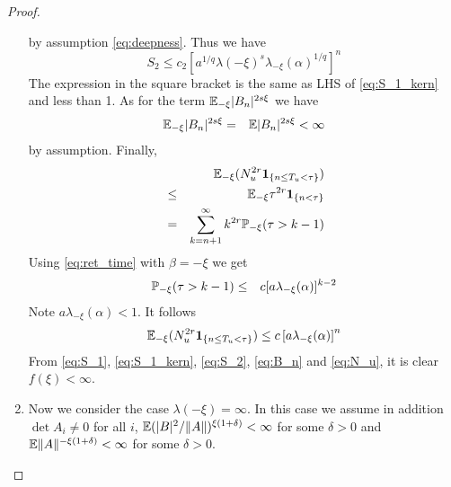 \documentclass{article}
\theoremstyle{remark}
\begin{document}
\begin{proof}
\begin{enumerate}
\[    \]
    by assumption \eqref{eq:deepness}. Thus we have
    \begin{equation}
      \label{eq:S_2}
      S_2 \leq c_2 \left[
        a^{1/q} \lambda(-\xi)^s
        \lambda_{-\xi}(\alpha)^{1/q}
      \right]^n
    \end{equation}
    The expression in the square bracket is the same as LHS of
    \eqref{eq:S_1_kern} and less than 1. As for the term
    $\E_{-\xi}|B_n|^{2s\xi}$ we have
    \begin{eqnarray}
      \E_{-\xi}|B_n|^{2s\xi} &=& \E|B_n|^{2s\xi} < \infty
      \label{eq:B_n}
    \end{eqnarray}
    by assumption. Finally,
    \begin{eqnarray*}
      && \E_{-\xi}(N_u^{2r}\1{n \leq T_u < \tau}) \\
      &\leq& \E_{-\xi} \tau^{2r} \1{n < \tau} \\
      &=& \sum_{k=n+1}^\infty k^{2r}
      \P_{-\xi}(\tau > k-1) \\
    \end{eqnarray*}
    Using \eqref{eq:ret_time} with $\beta = -\xi$ we get
    \begin{eqnarray*}
      \P_{-\xi}(\tau > k-1) &\leq&
      c [a \lambda_{-\xi}(\alpha)]^{k-2}
    \end{eqnarray*}
    Note $a \lambda_{-\xi}(\alpha) < 1$. It follows
    \begin{equation}
      \label{eq:N_u}
      \E_{-\xi}(N_u^{2r}\1{n \leq T_u < \tau}) \leq
      c \left[
        a \lambda_{-\xi}(\alpha)
      \right]^{n}
    \end{equation}
    From \eqref{eq:S_1}, \eqref{eq:S_1_kern}, \eqref{eq:S_2},
    \eqref{eq:B_n} and \eqref{eq:N_u}, it is clear $f(\xi) < \infty$.

  \item Now we consider the case $\lambda(-\xi) = \infty$. In this
    case we assume in addition $\det A_i \neq 0$ for all $i$,
    $\E (|B|^2/\|A\|)^{\xi(1 + \delta)} < \infty$ for some $\delta >
    0$ and $\E \|A\|^{-\xi(1 + \delta)} < \infty$ for some $\delta > 0$.
    

\end{enumerate}
\end{proof}
\end{document}
